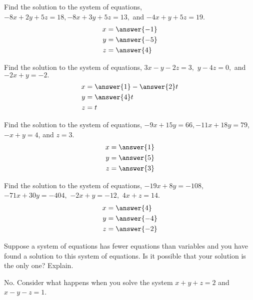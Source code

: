\documentclass{ximera}
\begin{document}
\begin{problem}\label{prb:2.35} Find the solution to the system of equations,
$-8x+2y+5z=18,-8x+3y+5z=13,$ and $-4x+y+5z=19.$
 \begin{align*}
 x&=\answer{-1}\\
 y&=\answer{-5}\\
 z&=\answer{4}\\
 \end{align*}
\end{problem}

\begin{problem}\label{prb:2.36} Find the solution to the system of equations, $3x-y-2z=3,$
$y-4z=0,$ and $-2x+y=-2.$
 \begin{align*}
 x&=\answer{1}-\answer{2}t\\
 y&=\answer{4}t\\
 z&=t\\
 \end{align*}
\end{problem}

\begin{problem}\label{prb:2.37} Find the solution to the system of equations,
$-9x+15y=66,-11x+18y=79$, $-x+y=4$, and $z=3$.
 \begin{align*}
 x&=\answer{1}\\
 y&=\answer{5}\\
 z&=\answer{3}\\
 \end{align*}
\end{problem}

\begin{problem}\label{prb:2.38} Find the solution to the system of equations, $-19x+8y=-108,$
$-71x+30y=-404,$ $-2x+y=-12,$ $4x+z=14.$
 \begin{align*}
 x&=\answer{4}\\
 y&=\answer{-4}\\
 z&=\answer{-2}\\
 \end{align*}
\end{problem}

\begin{problem}\label{prb:2.39} Suppose a system of equations has fewer equations than variables and
you have found a solution to this system of equations. Is it possible that
your solution is the only one? Explain.

\begin{hint}
No. Consider what happens when you solve the system $x+y+z=2$ and $x-y-z=1$.
\end{hint}
\end{problem}
\end{document}
